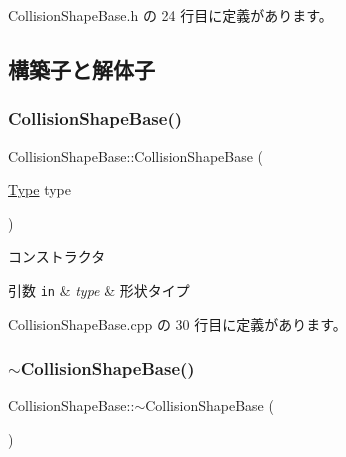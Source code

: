  Collision\+Shape\+Base.\+h の 24 行目に定義があります。



\subsection{構築子と解体子}
\mbox{\label{class_collision_shape_base_a9dd2ab42e2a6e96c6bff832ce8ca62b9}} 
\subsubsection{\texorpdfstring{Collision\+Shape\+Base()}{CollisionShapeBase()}}
{\footnotesize\ttfamily Collision\+Shape\+Base\+::\+Collision\+Shape\+Base (\begin{DoxyParamCaption}\item[{\mbox{\hyperlink{class_collision_shape_base_a8abcef092855ad0ca191047044b002cb}{Type}}}]{type }\end{DoxyParamCaption})}



コンストラクタ 


\begin{DoxyParams}[1]{引数}
\mbox{\tt in}  & {\em type} & 形状タイプ \\
\hline
\end{DoxyParams}


 Collision\+Shape\+Base.\+cpp の 30 行目に定義があります。

\mbox{\label{class_collision_shape_base_af6fb40d8815d749743555bd2ab505fe6}} 
\subsubsection{\texorpdfstring{$\sim$\+Collision\+Shape\+Base()}{~CollisionShapeBase()}}
{\footnotesize\ttfamily Collision\+Shape\+Base\+::$\sim$\+Collision\+Shape\+Base (\begin{DoxyParamCaption}{ }\end{DoxyParamCaption})\hspace{0.3cm}{\ttfamily [pure virtual]}}



